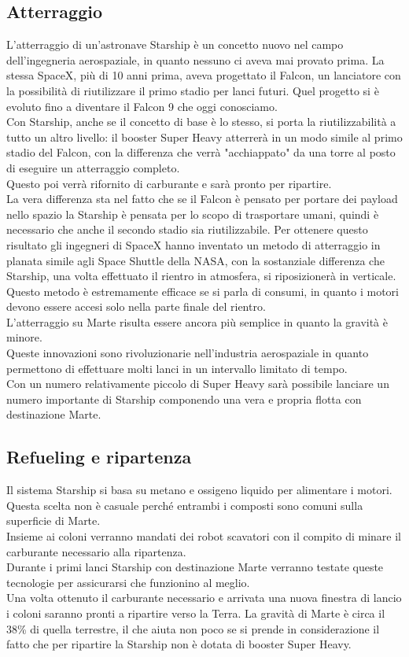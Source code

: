 \subsection{Atterraggio}
L'atterraggio di un'astronave Starship è un concetto nuovo nel campo dell'ingegneria aerospaziale, in quanto nessuno ci aveva mai provato prima. La stessa SpaceX, più di 10 anni prima, aveva progettato il Falcon, un lanciatore con la possibilità di riutilizzare il primo stadio per lanci futuri. Quel progetto si è evoluto fino a diventare il Falcon 9 che oggi conosciamo.\\
Con Starship, anche se il concetto di base è lo stesso, si porta la riutilizzabilità a tutto un altro livello: il booster Super Heavy atterrerà in un modo simile al primo stadio del Falcon, con la differenza che verrà "acchiappato" da una torre al posto di eseguire un atterraggio completo.\\
Questo poi verrà rifornito di carburante e sarà pronto per ripartire.\\
La vera differenza sta nel fatto che se il Falcon è pensato per portare dei payload nello spazio la Starship è pensata per lo scopo di trasportare umani, quindi è necessario che anche il secondo stadio sia riutilizzabile. Per ottenere questo risultato gli ingegneri di SpaceX hanno inventato un metodo di atterraggio in planata simile agli Space Shuttle della NASA, con la sostanziale differenza che Starship, una volta effettuato il rientro in atmosfera, si riposizionerà in verticale.\\
Questo metodo è estremamente efficace se si parla di consumi, in quanto i motori devono essere accesi solo nella parte finale del rientro. \\
L'atterraggio su Marte risulta essere ancora più semplice in quanto la gravità è minore.\\
Queste innovazioni sono rivoluzionarie nell'industria aerospaziale in quanto permettono di effettuare molti lanci in un intervallo limitato di tempo.\\
Con un numero relativamente piccolo di Super Heavy sarà possibile lanciare un numero importante di Starship componendo una vera e propria flotta con destinazione Marte.
\subsection{Refueling e ripartenza}
Il sistema Starship si basa su metano e ossigeno liquido per alimentare i motori. Questa scelta non è casuale perché entrambi i composti sono comuni sulla superficie di Marte.\\
Insieme ai coloni verranno mandati dei robot scavatori con il compito di minare il carburante necessario alla ripartenza.\\
Durante i primi lanci Starship con destinazione Marte verranno testate queste tecnologie per assicurarsi che funzionino al meglio.\\
Una volta ottenuto il carburante necessario e arrivata una nuova finestra di lancio i coloni saranno pronti a ripartire verso la Terra. La gravità di Marte è circa il 38\% di quella terrestre, il che aiuta non poco se si prende in considerazione il fatto che per ripartire la Starship non è dotata di booster Super Heavy.\\
    